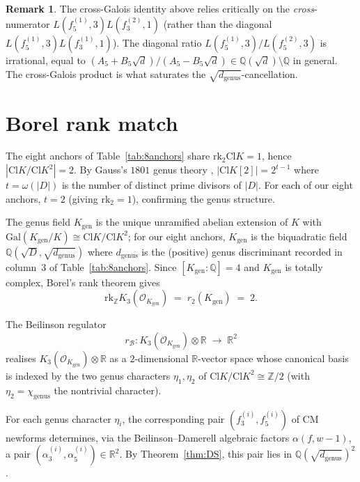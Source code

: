 \documentclass[11pt,a4paper]{amsart}
\theoremstyle{plain}
\theoremstyle{definition}
\newtheorem{remark}[theorem]{Remark}
\newcommand{\Q}{\mathbb{Q}}
\newcommand{\Z}{\mathbb{Z}}
\newcommand{\R}{\mathbb{R}}
\newcommand{\Gal}{\mathrm{Gal}}
\newcommand{\Cl}{\mathrm{Cl}}
\newcommand{\rkk}{\mathrm{rk}}
\newcommand{\Kgen}{K_{\mathrm{gen}}}
\begin{document}
\begin{remark}\label{rk:nondiagonal}
The cross-Galois identity above relies critically on the
\emph{cross}-numerator $L(f_5^{(1)}, 3) L(f_3^{(2)}, 1)$ (rather than
the diagonal $L(f_5^{(1)}, 3) L(f_3^{(1)}, 1)$). The diagonal ratio
$L(f_5^{(1)}, 3)/L(f_5^{(2)}, 3)$ is irrational, equal to
$(A_5 + B_5\sqrt d)/(A_5 - B_5\sqrt d) \in \Q(\sqrt d) \setminus \Q$ in
general. The cross-Galois product is what saturates the
$\sqrt{d_{\mathrm{genus}}}$-cancellation.
\end{remark}

\section{Borel rank match}\label{sec:Borel}

The eight anchors of Table~\ref{tab:8anchors} share $\rkk_2 \Cl K = 1$,
hence $|\Cl K / \Cl K^2| = 2$. By Gauss's $1801$ genus theory
\cite[\S\S225--237]{Gauss1801}, $|\Cl K[2]| = 2^{t - 1}$ where
$t = \omega(|D|)$ is the number of distinct prime divisors of $|D|$.
For each of our eight anchors, $t = 2$ (giving $\rkk_2 = 1$), confirming
the genus structure.

The genus field $\Kgen$ is the unique unramified abelian extension of
$K$ with $\Gal(\Kgen/K) \cong \Cl K / \Cl K^2$; for our eight anchors,
$\Kgen$ is the biquadratic field $\Q(\sqrt D, \sqrt{d_{\mathrm{genus}}})$
where $d_{\mathrm{genus}}$ is the (positive) genus discriminant
recorded in column~3 of Table~\ref{tab:8anchors}. Since $[\Kgen : \Q] = 4$
and $\Kgen$ is totally complex, Borel's rank theorem
\cite[Theorem 1]{Borel1974} gives
\[
  \rkk_\Z K_3(\mathcal{O}_\Kgen) \;=\; r_2(\Kgen) \;=\; 2.
\]

The Beilinson regulator
\[
  r_\mathcal{B} : K_3(\mathcal{O}_\Kgen) \otimes \R \;\longrightarrow\; \R^2
\]
realises $K_3(\mathcal{O}_\Kgen) \otimes \R$ as a $2$-dimensional
$\R$-vector space whose canonical basis is indexed by the two genus
characters $\eta_1, \eta_2$ of $\Cl K / \Cl K^2 \cong \Z/2$
(with $\eta_2 = \chi_{\mathrm{genus}}$ the nontrivial character).

For each genus character $\eta_i$, the corresponding pair
$(f_3^{(i)}, f_5^{(i)})$ of CM newforms determines, via the
Beilinson--Damerell algebraic factors $\alpha(f, w-1)$, a pair
$(\alpha_3^{(i)}, \alpha_5^{(i)}) \in \R^2$. By Theorem~\ref{thm:DS},
this pair lies in $\Q(\sqrt{d_{\mathrm{genus}}})^2$.
\end{document}
